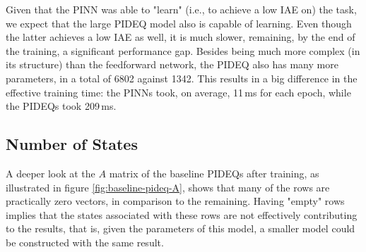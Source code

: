 Given that the \gls{PINN} was able to "learn" (i.e., to achieve a low IAE on) the task, we expect that the large \gls{PIDEQ} model also is capable of learning.
Even though the latter achieves a low IAE as well, it is much slower, remaining, by the end of the training, a significant performance gap.
Besides being much more complex (in its structure) than the feedforward network, the \gls{PIDEQ} also has many more parameters, in a total of 6802 against 1342.
This results in a big difference in the effective training time: the \gls{PINN}s took, on average, 11\,ms for each epoch, while the \gls{PIDEQ}s took 209\,ms.

\subsection{Number of States}

A deeper look at the $A$ matrix of the baseline \gls{PIDEQ}s after training, as illustrated in figure \ref{fig:baseline-pideq-A}, shows that many of the rows are practically zero vectors, in comparison to the remaining.
Having "empty" rows implies that the states associated with these rows are not effectively contributing to the results, that is, given the parameters of this model, a smaller model could be constructed with the same result.  

